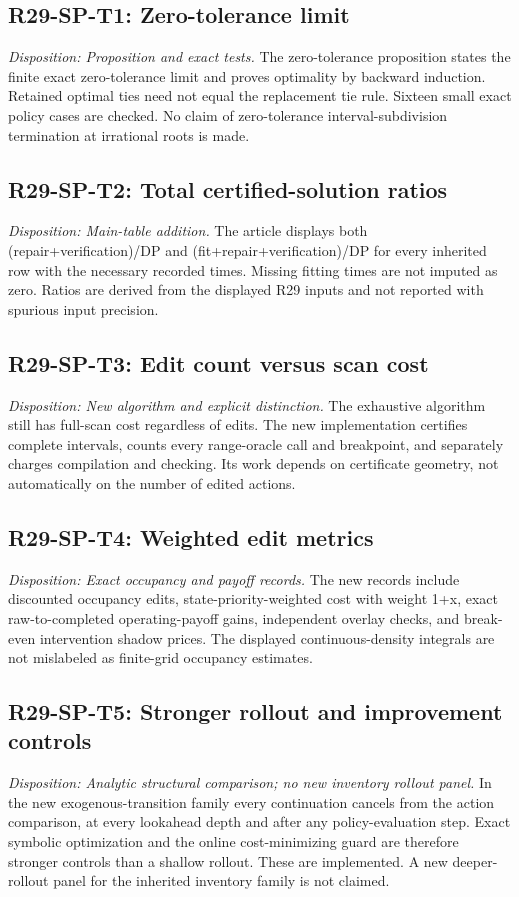 \subsection{R29-SP-T1: Zero-tolerance limit}
\textit{Disposition: Proposition and exact tests.} The zero-tolerance proposition states the finite exact zero-tolerance limit and proves optimality by backward induction. Retained optimal ties need not equal the replacement tie rule. Sixteen small exact policy cases are checked. No claim of zero-tolerance interval-subdivision termination at irrational roots is made.
\subsection{R29-SP-T2: Total certified-solution ratios}
\textit{Disposition: Main-table addition.} The article displays both (repair+verification)/DP and (fit+repair+verification)/DP for every inherited row with the necessary recorded times. Missing fitting times are not imputed as zero. Ratios are derived from the displayed R29 inputs and not reported with spurious input precision.
\subsection{R29-SP-T3: Edit count versus scan cost}
\textit{Disposition: New algorithm and explicit distinction.} The exhaustive algorithm still has full-scan cost regardless of edits. The new implementation certifies complete intervals, counts every range-oracle call and breakpoint, and separately charges compilation and checking. Its work depends on certificate geometry, not automatically on the number of edited actions.
\subsection{R29-SP-T4: Weighted edit metrics}
\textit{Disposition: Exact occupancy and payoff records.} The new records include discounted occupancy edits, state-priority-weighted cost with weight 1+x, exact raw-to-completed operating-payoff gains, independent overlay checks, and break-even intervention shadow prices. The displayed continuous-density integrals are not mislabeled as finite-grid occupancy estimates.
\subsection{R29-SP-T5: Stronger rollout and improvement controls}
\textit{Disposition: Analytic structural comparison; no new inventory rollout panel.} In the new exogenous-transition family every continuation cancels from the action comparison, at every lookahead depth and after any policy-evaluation step. Exact symbolic optimization and the online cost-minimizing guard are therefore stronger controls than a shallow rollout. These are implemented. A new deeper-rollout panel for the inherited inventory family is not claimed.
